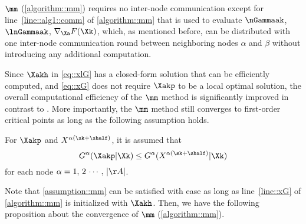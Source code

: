 \begin{remark}
	$\mm$  (\cref{algorithm::mm}) requires no inter-node communication except for  line~\ref{line::alg1::comm} of \cref{algorithm::mm} that is used to evaluate $\nGammaak$, $\lnGammaak$, $\nabla_{\Xa} F(\Xk)$, which, as mentioned before, can be distributed with one inter-node communication round between neighboring nodes $\alpha$ and $\beta$ without introducing any additional computation.
\end{remark}



Since  $\Xakh$ in \cref{eq::xlG} has a closed-form solution that can be efficiently computed, and \cref{eq::xG} does not require $\Xakp$ to be a local optimal solution, the overall computational efficiency of the $\mm$ method is significantly improved in contrast to \cite{fan2019proximal,fan2020mm}. More importantly, the $\mm$ method still converges to first-order critical points as long as the following assumption holds.

\begin{assumption}\label{assumption::mm}
For $\Xakp$ and $X^{\alpha(\sk+\shalf)}$, it is assumed that
\begin{equation}
G^{\alpha}(\Xakp|\Xk)\leq G^{\alpha}(X^{\alpha(\sk+\shalf)}|\Xk)
\end{equation}
for each node $\alpha=1,\,2\,\cdots,\, |\AA|$.
\end{assumption}

Note that \cref{assumption::mm} can be satisfied with ease as long as line~\ref{line::xG} of \cref{algorithm::mm} is initialized with $\Xakh$. Then, we have the following proposition about the convergence of $\mm$  (\cref{algorithm::mm}).

